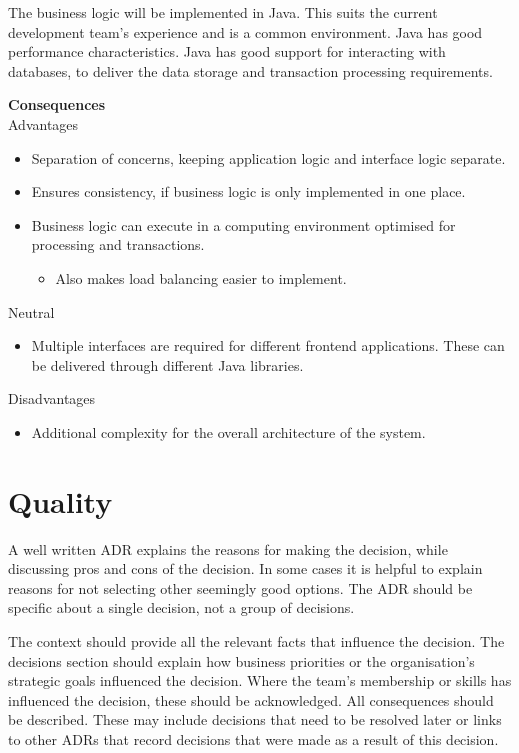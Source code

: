 The business logic will be implemented in Java.
This suits the current development team's experience and is a common environment.
Java has good performance characteristics.
Java has good support for interacting with databases, to deliver the data storage and transaction processing requirements.

\filbreak
\noindent\textbf{Consequences}\\
Advantages
\begin{itemize}[topsep=0pt,noitemsep]
    \item Separation of concerns, keeping application logic and interface logic separate.
    \item Ensures consistency, if business logic is only implemented in one place.
    \item Business logic can execute in a computing environment optimised for processing and transactions.
    \begin{itemize}[topsep=0pt,noitemsep]
        \item Also makes load balancing easier to implement.
    \end{itemize}
\end{itemize}
Neutral
\begin{itemize}[topsep=0pt,noitemsep]
    \item Multiple interfaces are required for different frontend applications.
             These can be delivered through different Java libraries.
\end{itemize}
Disadvantages
\begin{itemize}[topsep=0pt,noitemsep]
    \item Additional complexity for the overall architecture of the system.
\end{itemize}

\section{Quality}
A well written ADR explains the reasons for making the decision, while discussing pros and cons of the decision.
In some cases it is helpful to explain reasons for not selecting other seemingly good options.
The ADR should be specific about a single decision, not a group of decisions.

The context should provide all the relevant facts that influence the decision.
The decisions section should explain how business priorities or the organisation's strategic goals influenced the decision.
Where the team's membership or skills has influenced the decision, these should be acknowledged.
All consequences should be described.
These may include decisions that need to be resolved later or
links to other ADRs that record decisions that were made as a result of this decision.

